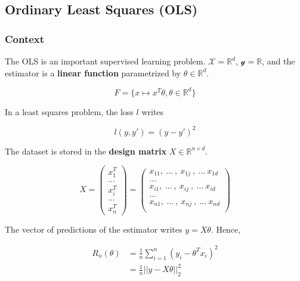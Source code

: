\documentclass[
10pt, %
a4paper, %
oneside, %
headinclude,footinclude, %
BCOR5mm, %
]{scrartcl}
\begin{document}
\subsection{\large\color{MidnightBlue}Ordinary Least Squares (OLS)}
\label{subsec:ols}

\subsubsection{\large\color{Periwinkle}Context}
\label{con:ols}

The OLS is an important supervised learning problem. $ \mathcal{X} = \mathbb{R}^d$, $ \mathcal{y}  = \mathbb{R} $, and the estimator is a \textbf{{linear function}} parametrized by $ \theta\in \mathbb{R}^d$.

\begin{equation*}
    F = \{ x\mapsto x^T \theta, \theta \in \mathbb{R}^d\}
\end{equation*}

In a least squares problem, the loss $l$ writes 

\begin{equation*}
    l(y,y') = (y-y')^2
\end{equation*}

The dataset is stored in the \textbf{{design matrix}} $X\in \mathbb{R}^{n\times d}$.

\begin{equation*}
X=
\begin{pmatrix}
x_{1}^T\\
...\\
x_{i}^T\\
...\\
x_{n}^T
\end{pmatrix}
=
\begin{pmatrix}
    x_{11}, \:\dots\:,\: x_{1j}\:, \:\dots\: x_{1d}\\
...\\
    x_{i1}, \:\dots\:,\: x_{ij}\:, \:\dots\: x_{id}\\
...\\
    x_{n1}, \:\dots\:,\: x_{nj}\:, \:\dots\: x_{nd}\\
\end{pmatrix}
\end{equation*}

The vector of predictions of the estimator writes $y = X\theta$.  Hence,

\begin{equation*}
    \begin{aligned}
	R_n(\theta) &= \frac{1}{n} \sum^{n}_{i=1} (y_i-\theta^Tx_i)^2\\
	&= \frac{1}{n} ||y-X\theta||_2^2
    \end{aligned}
\end{equation*}
\end{document}
